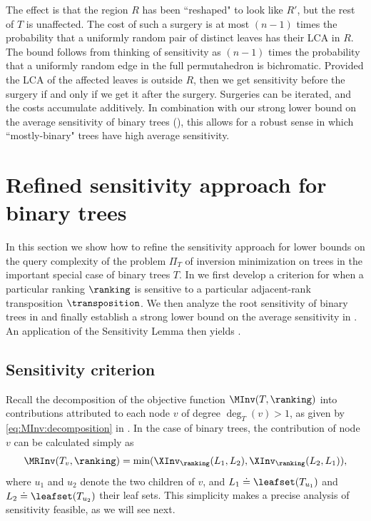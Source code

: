 The effect is that the region $R$ has been ``reshaped" to look like $R'$, but the rest of $T$ is unaffected. The cost of such a surgery is at most $(n-1)$ times the probability that a 
uniformly random pair of distinct leaves has their LCA in $R$. The bound follows from thinking of sensitivity as $(n-1)$ times the probability that a uniformly random edge in the full permutahedron is bichromatic. Provided the LCA of 
the affected leaves is outside $R$, then we get sensitivity before the surgery if and only if we get it after the surgery. Surgeries can be iterated, and the costs accumulate additively. In combination with our strong lower bound on the average sensitivity of binary trees (), this allows for a robust sense in which ``mostly-binary" trees have high average sensitivity.



\section{Refined sensitivity approach for binary trees}
\label{sec:sensitivity:binary}

In this section we show how to refine the sensitivity approach for lower bounds on the query complexity of the problem $\Pi_T$ of inversion minimization on trees in the important special case of binary trees $T$. In  we first develop a criterion for when a particular ranking $\ranking$ is sensitive to a particular adjacent-rank transposition $\transposition$.
We then analyze the root sensitivity of binary trees in  and finally establish a strong lower bound on the average sensitivity in . An application of the Sensitivity Lemma then yields .

\subsection{Sensitivity criterion}
\label{sec:binary:criterion}

Recall the decomposition of the objective function $\MInv(T,\ranking)$ into contributions attributed to each node $v$ of degree $\deg_T(v)>1$, as given by \eqref{eq:MInv:decomposition} in . In the case of binary trees, the contribution of node $v$ can be calculated simply as
\begin{equation}\label{eq:contribution:binary:retake}
\MRInv(T_v,\ranking) = \min(\XInv_\ranking(L_1,L_2),\XInv_\ranking(L_2,L_1)),
\end{equation}
where $u_1$ and $u_2$ denote the two children of $v$, and $L_1 \doteq \leafset(T_{u_1})$ and $L_2 \doteq \leafset(T_{u_2})$ their leaf sets. This simplicity makes a precise analysis of sensitivity feasible, as we will see next. 

